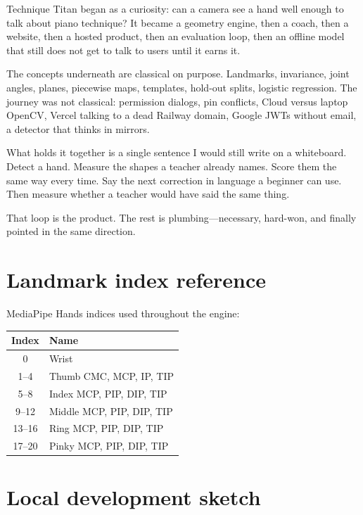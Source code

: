 \documentclass[11pt,a4paper]{article}
\begin{document}
Technique Titan began as a curiosity: can a camera see a hand well enough to talk about piano technique?
It became a geometry engine, then a coach, then a website, then a hosted product, then an evaluation loop, then an offline model that still does not get to talk to users until it earns it.

The concepts underneath are classical on purpose.
Landmarks, invariance, joint angles, planes, piecewise maps, templates, hold-out splits, logistic regression.
The journey was not classical: permission dialogs, pin conflicts, Cloud versus laptop OpenCV, Vercel talking to a dead Railway domain, Google JWTs without email, a detector that thinks in mirrors.

What holds it together is a single sentence I would still write on a whiteboard.
Detect a hand.
Measure the shapes a teacher already names.
Score them the same way every time.
Say the next correction in language a beginner can use.
Then measure whether a teacher would have said the same thing.

That loop is the product.
The rest is plumbing---necessary, hard-won, and finally pointed in the same direction.

\appendix
\section{Landmark index reference}

MediaPipe Hands indices used throughout the engine:

\begin{center}
\begin{tabular}{cl}
\toprule
\textbf{Index} & \textbf{Name} \\
\midrule
0 & Wrist \\
1--4 & Thumb CMC, MCP, IP, TIP \\
5--8 & Index MCP, PIP, DIP, TIP \\
9--12 & Middle MCP, PIP, DIP, TIP \\
13--16 & Ring MCP, PIP, DIP, TIP \\
17--20 & Pinky MCP, PIP, DIP, TIP \\
\bottomrule
\end{tabular}
\end{center}

\section{Local development sketch}
\end{document}
